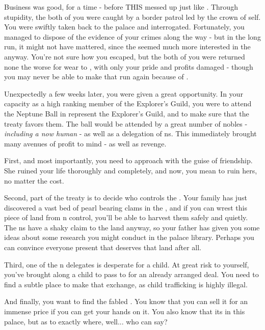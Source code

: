 \documentclass[char]{NeptuneBall}
\begin{document}
Business was good, for a time - before THIS \cPrincess{\prince} messed up just like \cPrincess{\their} \cAriel{\sibling}. Through \cPrincess{\their} stupidity, the both of you were caught by a border patrol led by the crown \cPrince{\Prince} of \pPacifica{} \cPrince{\them}self. You were swiftly taken back to the palace and interrogated. Fortunately, you managed to dispose of the evidence of your crimes along the way - but in the long run, it might not have mattered, since the \cPrince{\prince} seemed much more interested in the \cPrincess{\prince} anyway. You're not sure how you escaped, but the both of you were returned none the worse for wear to \pAtlantis{}, with only your pride and profits damaged - though you may never be able to make that run again because of \emph{\cPrincess{\them}}.
 
Unexpectedly a few weeks later, you were given a great opportunity. In your capacity as a high ranking member of the Explorer's Guild, you were to attend the Neptune Ball in represent the Explorer's Guild, and to make sure that the treaty favors them. The ball would be attended by a great number of nobles - \emph{including a now human \cAriel{}} - as well as a delegation of \pPacifica{}ns. This immediately brought many avenues of profit to mind - as well as revenge.

First, and most importantly, you need to approach \cAriel{} with the guise of friendship. She ruined your life thoroughly and completely, and now, you mean to ruin hers, no matter the cost.

Second, part of the treaty is to decide who controls the \pGazaStrip{}. Your family has just discovered a vast bed of pearl bearing clams in the \ptrench{}, and if you can wrest this piece of land from \pPacifica{}n control, you'll be able to harvest them safely and quietly. The \pPacifica{}ns have a shaky claim to the land anyway, so your father has given you some ideas about some research you might conduct in the palace library. Perhaps you can convince everyone present that \pAtlantis{} deserves that land after all.

Third, one of the \pPacifica{}n delegates is desperate for a child. At great risk to yourself, you've brought along a child to pass to \cBodyguard{\them} for an already arranged deal. You need to find a subtle place to make that exchange, as child trafficking is highly illegal.

And finally, you want to find the fabled \iGlowShell{\MYname}. You know that you can sell it for an immense price if you can get your hands on it. You also know that its in this palace, but as to exactly where, well... who can say?
\end{document}
